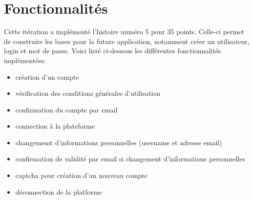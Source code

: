 \section{Fonctionnalités} 
Cette itération a implémenté l'histoire numéro 5 pour 35 points. Celle-ci permet de construire les bases pour la future application, notamment créer un utilisateur, login et mot de passe. Voici listé ci-dessous les différentes fonctionnalités implémentées:
\begin{itemize}
\item création d'un compte
\item vérification des conditions générales d'utilisation
\item confirmation du compte par email
\item connection à la plateforme 
\item changememt d'informations personnelles (username et adresse email)
\item confirmation de validité par email si changement d'informations personnelles
\item captcha pour création d'un nouveau compte
\item déconnection de la platforme
\end{itemize}